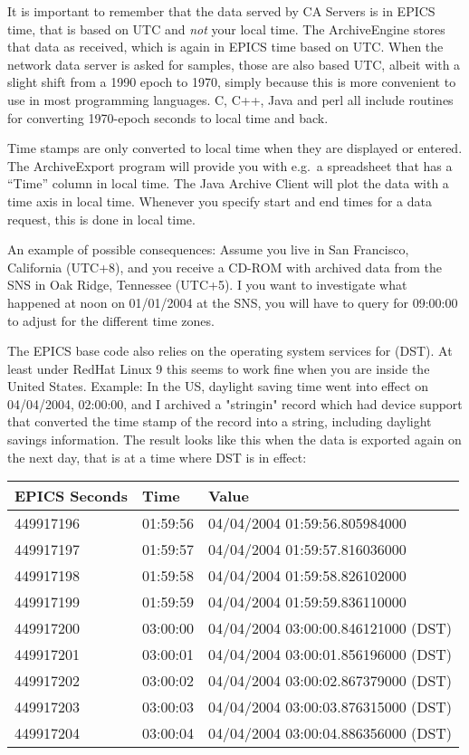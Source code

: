 It is important to remember that the data served by CA Servers is in
EPICS time, that is based on UTC and \emph{not} your local time.  The
ArchiveEngine stores that data as received, which is again in EPICS
time based on UTC.  When the network data server is asked for samples,
those are also based UTC, albeit with a slight shift from a 1990 epoch
to 1970, simply because this is more convenient to use in most
programming languages. C, C++, Java and perl all include routines for
converting 1970-epoch seconds to local time and back.

Time stamps are only converted to local time when they are displayed
or entered.  The ArchiveExport program will provide you with e.g.\ a
spreadsheet that has a ``Time'' column in local time. The Java Archive
Client will plot the data with a time axis in local time. Whenever you
specify start and end times for a data request, this is done in local
time.

An example of possible consequences: Assume you live in San Francisco,
California (UTC+8), and you receive a CD-ROM with archived data from the SNS
in Oak Ridge, Tennessee (UTC+5). I you want to investigate what happened
at noon on 01/01/2004 at the SNS, you will have to query for
09:00:00 to adjust for the different time zones.

The EPICS base code also relies on the operating system services for
 (DST). At least under RedHat Linux 9 this
seems to work fine when you are inside the United States.
Example: In the US, daylight saving time went into effect on
04/04/2004, 02:00:00, and I archived a "stringin" record which had
device support that converted the time stamp of the record into a string,
including daylight savings information.
The result looks like this when the data is exported again
on the next day, that is at a time where DST is in effect:

\medskip
\begin{tabular}{lll}
EPICS Seconds & Time     & Value \\
\hline
449917196     & 01:59:56 & 04/04/2004 01:59:56.805984000 \\
449917197     & 01:59:57 & 04/04/2004 01:59:57.816036000 \\
449917198     & 01:59:58 & 04/04/2004 01:59:58.826102000 \\
449917199     & 01:59:59 & 04/04/2004 01:59:59.836110000 \\
449917200     & 03:00:00 & 04/04/2004 03:00:00.846121000 (DST) \\
449917201     & 03:00:01 & 04/04/2004 03:00:01.856196000 (DST) \\
449917202     & 03:00:02 & 04/04/2004 03:00:02.867379000 (DST) \\
449917203     & 03:00:03 & 04/04/2004 03:00:03.876315000 (DST) \\
449917204     & 03:00:04 & 04/04/2004 03:00:04.886356000 (DST) 
\end{tabular}


